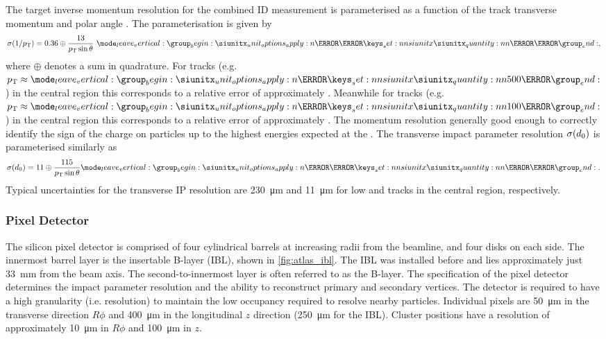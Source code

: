 The target inverse momentum resolution for the combined ID measurement is parameterised as a function of the track transverse momentum and polar angle \cite{ATLAS-TDR-14}.
The parameterisation is given by
%
\begin{equation}
  \sigma(1/\pt) = 0.36 \oplus \frac{13}{\pt \sin\theta} ~\SI{}{\per\TeV} ,
\end{equation}
%
where $\oplus$ denotes a sum in quadrature.
For \lowpt tracks (e.g. $\pt \approx \SI{500}{\MeV}$) in the central region this corresponds to a relative error of approximately .
Meanwhile for \highpt tracks (e.g. $\pt \approx \SI{100}{\GeV}$) in the central region this corresponds to a relative error of approximately .
The momentum resolution generally good enough to correctly identify the sign of the charge on particles up to the highest energies expected at the \LHC.
The transverse impact parameter resolution $\sigma(d_{0})$ is parameterised similarly as
%
\begin{equation}
  \sigma(\dzero) = 11 \oplus \frac{115}{\pt \sin\theta} \SI{}{\micro\meter} .
\end{equation}
%
Typical uncertainties for the transverse IP resolution are \SI{230}{\micro\meter} and \SI{11}{\micro\meter} for low and \highpt tracks in the central region, respectively.

\subsubsection{Pixel Detector}
The silicon pixel detector is comprised of four cylindrical barrels at increasing radii from the beamline, and four disks on each side.
The innermost barrel layer is the insertable B-layer (IBL), shown in \cref{fig:atlas_ibl}.
The IBL was installed before \runtwo \cite{ATLAS-TDR-19,PIX-2018-001} and lies approximately just \SI{33}{\milli\meter} from the beam axis.
The second-to-innermost layer is often referred to as the B-layer.
The specification of the pixel detector determines the impact parameter resolution and the ability to reconstruct primary and secondary vertices.
The detector is required to have a high granularity (i.e. resolution) to maintain the low occupancy required to resolve nearby particles. %
Individual pixels are \SI{50}{\micro\meter} in the transverse direction $R\phi$ and \SI{400}{\micro\meter} in the longitudinal $z$ direction (\SI{250}{\micro\meter} for the IBL).
Cluster positions have a resolution of approximately \SI{10}{\micro\meter} in $R\phi$ and \SI{100}{\micro\meter} in $z$.

